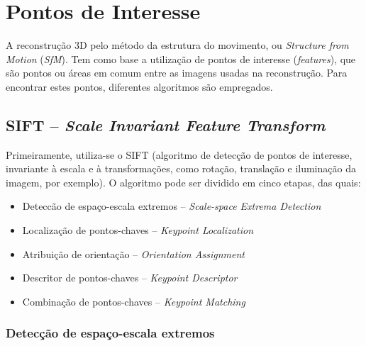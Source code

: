 \chapter{Pontos de Interesse}\label{sec:pontosdeinteresse}
%
A reconstrução 3D pelo método da estrutura do movimento, ou {\it Structure from Motion} ({\it SfM}). Tem como base a utilização de pontos de interesse
({\it features}), que são pontos ou áreas em comum entre as imagens usadas na reconstrução. Para encontrar estes pontos, diferentes algoritmos são empregados.

\section { SIFT -- {\it Scale Invariant Feature Transform}}

Primeiramente, utiliza-se o SIFT (algoritmo de detecção de pontos de interesse, invariante à escala e à transformações, como rotação, translação e iluminação da imagem, por exemplo).
O algoritmo pode ser dividido em cinco etapas, das quais:

\begin{itemize}
	\item{Deteccão de espaço-escala extremos -- {\it Scale-space Extrema Detection}}
	\item{Localização de pontos-chaves -- {\it Keypoint Localization}}
	\item{Atribuição de orientação -- {\it Orientation Assignment}}
	\item{Descritor de pontos-chaves -- {\it Keypoint Descriptor}}
	\item{Combinação de pontos-chaves -- {\it Keypoint Matching}}
\end{itemize}


\subsection{Detecção de espaço-escala extremos}


